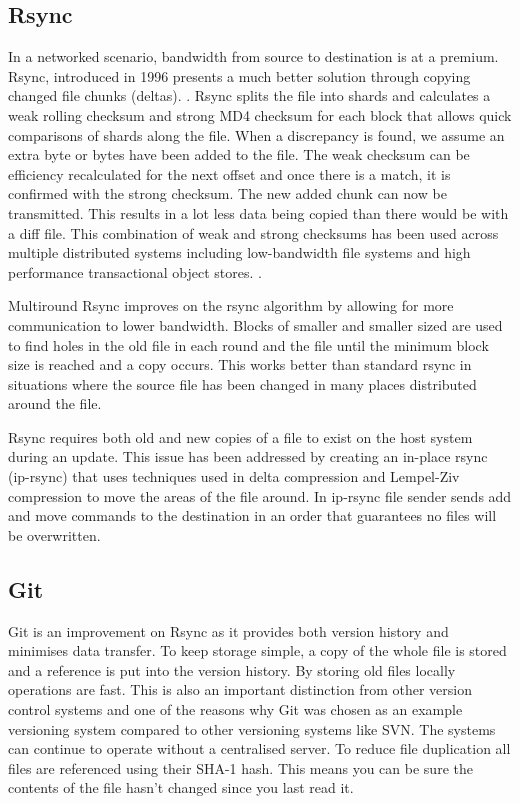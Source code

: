 \documentclass[a4paper, 11pt, twocolumn, twoside]{report}
\begin{document}
\subsection{Rsync}
In a networked scenario, bandwidth from source to destination is at a premium. Rsync, introduced in 1996 presents a much better solution through copying changed file chunks (deltas). \citep{tridgell1996rsync}. Rsync splits the file into shards and calculates a weak rolling checksum and strong MD4 checksum for each block that allows quick comparisons of shards along the file. When a discrepancy is found, we assume an extra byte or bytes have been added to the file. The weak checksum can be efficiency recalculated for the next offset and once there is a match, it is confirmed with the strong checksum. The new added chunk can now be transmitted. This results in a lot less data being copied than there would be with a diff file. \citep{tridgell1996rsync} This combination of weak and strong checksums has been used across multiple distributed systems including low-bandwidth file systems \citep{muthitacharoen2001low} and high performance transactional object stores. \citep{stephen2000platypus}.

Multiround Rsync improves on the rsync algorithm by allowing for more communication to lower bandwidth. Blocks of smaller and smaller sized are used to find holes in the old file in each round and the file until the minimum block size is reached and a copy occurs. \citep{multiroundrsync} This works better than standard rsync in situations where the source file has been changed in many places distributed around the file.

Rsync requires both old and new copies of a file to exist on the host system during an update. This issue has been addressed by creating an in-place rsync (ip-rsync) that uses techniques used in delta compression and Lempel-Ziv compression to move the areas of the file around. In ip-rsync file sender sends add and move commands to the destination in an order that guarantees no files will be overwritten. \citep{rasch2003place}


\subsection{Git}
Git is an improvement on Rsync as it provides both version history and minimises data transfer. To keep storage simple, a copy of the whole file is stored and a reference is put into the version history. By storing old files locally operations are fast. This is also an important distinction from other version control systems and one of the reasons why Git was chosen as an example versioning system compared to other versioning systems like SVN. The systems can continue to operate without a centralised server. To reduce file duplication all files are referenced using their SHA-1 hash. This means you can be sure the contents of the file hasn’t changed since you last read it. \citep{torvalds2010git}
\end{document}
